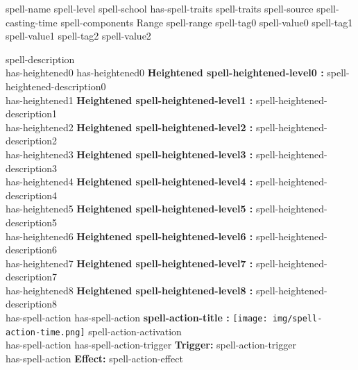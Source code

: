 \documentclass{article}
\begin{document}
\begin{spell}
{spell-name} %
{spell-level} %
{spell-school has-spell-traits spell-traits} %
{spell-source} %
{spell-casting-time} %
{spell-components} %
{Range} {spell-range}
{spell-tag0} {spell-value0}
{spell-tag1} {spell-value1}
{spell-tag2} {spell-value2}
    \begingroup
        \singlespacing
        \begin{singlespace*}
        \par\fontsize{spell-font-size}{10pt}\selectfont
        \vspace{7mm}   %
        spell-description\\
        
        has-heightened0 \vspace{2mm}
        has-heightened0 \textbf{Heightened spell-heightened-level0 :} spell-heightened-description0\\
        has-heightened1 \textbf{Heightened spell-heightened-level1 :} spell-heightened-description1\\
        has-heightened2 \textbf{Heightened spell-heightened-level2 :} spell-heightened-description2\\
        has-heightened3 \textbf{Heightened spell-heightened-level3 :} spell-heightened-description3\\
        has-heightened4 \textbf{Heightened spell-heightened-level4 :} spell-heightened-description4\\
        has-heightened5 \textbf{Heightened spell-heightened-level5 :} spell-heightened-description5\\
        has-heightened6 \textbf{Heightened spell-heightened-level6 :} spell-heightened-description6\\
        has-heightened7 \textbf{Heightened spell-heightened-level7 :} spell-heightened-description7\\
        has-heightened8 \textbf{Heightened spell-heightened-level8 :} spell-heightened-description8\\

        has-spell-action \vspace{2mm}
        has-spell-action \textbf{spell-action-title :} \texttt{[image: img/spell-action-time.png]} spell-action-activation\\
        has-spell-action has-spell-action-trigger \textbf{Trigger:} spell-action-trigger\\
        has-spell-action \textbf{Effect:} spell-action-effect\\


\end{singlespace*}
\end{spell}
\end{document}
